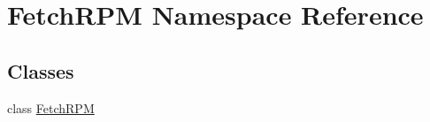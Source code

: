 \hypertarget{namespace_fetch_r_p_m}{\section{Fetch\-R\-P\-M Namespace Reference}
\label{namespace_fetch_r_p_m}
}
\subsection*{Classes}
\begin{DoxyCompactItemize}
\item 
class \hyperlink{class_fetch_r_p_m_1_1_fetch_r_p_m}{Fetch\-R\-P\-M}
\end{DoxyCompactItemize}
